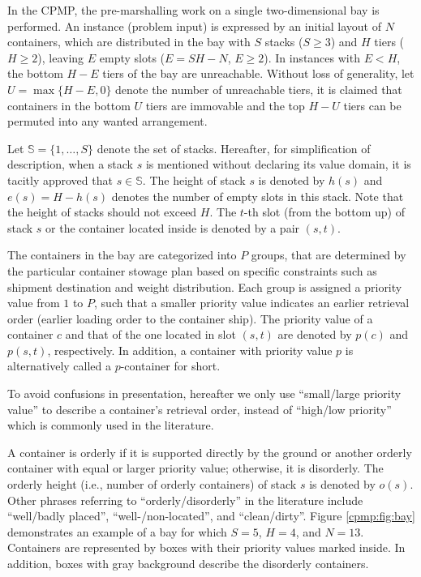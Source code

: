 \documentclass{article}
\begin{document}
In the CPMP, the pre-marshalling work on a single two-dimensional bay is performed. An instance (problem input) is expressed by an initial layout of $N$ containers, which are distributed in the bay with $S$ stacks ($S\ge 3$) and $H$ tiers ($H\ge 2$), leaving $E$ empty slots ($E=SH-N$, $E\ge 2$).
In instances with $E<H$, the bottom $H-E$ tiers of the bay are unreachable. Without loss of generality, let $U=\max\{H-E,0\}$ denote the number of unreachable tiers, it is claimed that containers in the bottom $U$ tiers are immovable and the top $H-U$ tiers can be permuted into any wanted arrangement.

Let $\mathbb{S}=\{1,\dots,S\}$ denote the set of stacks. Hereafter, for simplification of description, when a stack $s$ is mentioned without declaring its value domain, it is tacitly approved that $s\in\mathbb{S}$. The height of stack $s$ is denoted by $h(s)$ and $e(s)=H-h(s)$ denotes the number of empty slots in this stack. Note that the height of stacks should not exceed $H$. The $t$-th slot (from the bottom up) of stack $s$ or the container located inside is denoted by a pair $(s,t)$. 


The containers in the bay are categorized into $P$ groups, that are determined by the particular container stowage plan based on specific constraints such as shipment destination and weight distribution. Each group is assigned a priority value from $1$ to $P$, such that a smaller priority value indicates an earlier retrieval order (earlier loading order to the container ship). The priority value of a container $c$ and that of the one located in slot $(s,t)$ are denoted by $p(c)$ and $p(s,t)$, respectively. In addition, a container with priority value $p$ is alternatively called a $p$-container for short.

To avoid confusions in presentation, hereafter we only use ``small{\slash}large priority value'' to describe a container's retrieval order, instead of ``high{\slash}low priority'' which is commonly used in the literature.

A container is orderly if it is supported directly by the ground or another orderly container with equal or larger priority value; otherwise, it is disorderly. The orderly height (i.e., number of orderly containers) of stack $s$ is denoted by $o(s)$. Other phrases referring to ``orderly{\slash}disorderly'' in the  literature include ``well{\slash}badly placed'', ``well-{\slash}non-located'', and ``clean{\slash}dirty''. 
Figure \ref{cpmp:fig:bay} demonstrates an example of a bay for which $S=5$, $H=4$, and $N=13$. Containers are represented by boxes with their priority values marked inside. In addition, boxes with gray background describe the disorderly containers.
\end{document}

